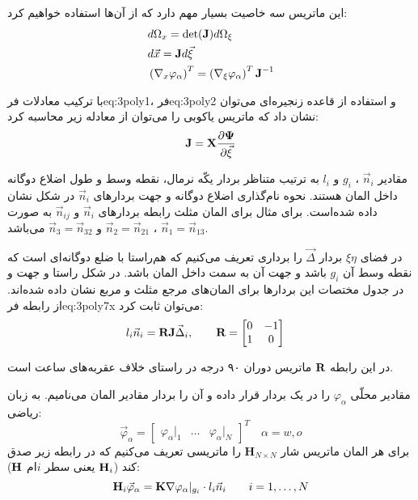 این ماتریس سه خاصیت بسیار مهم دارد که از آن‌ها استفاده خواهیم کرد:
\begin{align}
\label{eq:3poly7}
&d\Omega_x = \text{det}(\textbf J) d\Omega_\xi \\
\label{eq:3poly7x}
&d\vec x = \textbf J d\vec \xi \\
\label{eq:3poly7xx}
&\left( \nabla_x \varphi_\alpha \right)^T = \left(\nabla_\xi \varphi_\alpha\right)^T \textbf J ^ {-1}
\end{align}

با ترکیب معادلات ‌فر{eq:3poly1}، ‌فر{eq:3poly2} و استفاده از قاعده زنجیره‌ای می‌توان نشان داد که ماتریس یاکوبی را می‌توان از معادله زیر محاسبه کرد:
\begin{equation}
\label{eq:3poly8}
\textbf J =  \textbf X \frac{\partial \mathbf \Psi}{\partial \vec \xi} 
\end{equation}

مقادیر 
$\vec n_i$ ، $g_i$ و $l_i$
به ترتیب متناظر بردار یکّه نرمال، نقطه وسط و طول اضلاع دوگانه داخل المان هستند. نحوه نام‌گذاری اضلاع دوگانه و جهت بردار‌های $\vec n_i$ در شکل  نشان داده شده‌است. برای مثال برای المان مثلث رابطه بردارهای $\vec n_i$ و $\vec n_{ij}$ به صورت 
$\vec n_1 = \vec n_{13}$ ، $\vec n_2 = \vec n_{21}$ و $\vec n_3 = \vec n_{32}$
می‌باشد.

در فضای $\xi \eta$ بردار‌ $\vec \Delta$ را برداری تعریف می‌کنیم که هم‌راستا با ضلع دوگانه‌ای است که نقطه وسط آن $g_i$ باشد و جهت آن به سمت داخل المان باشد. در شکل  راستا و جهت و در جدول  مختصات این بردار‌ها برای المان‌های مرجع مثلث و مربع نشان داده‌ شده‌اند. از رابطه ‌فر{eq:3poly7x} می‌توان ثابت کرد:
\begin{equation}
\label{eq:3poly9}
l_i\vec n_i = \textbf R \textbf J \vec \Delta_i, 
\qquad \textbf{R} = 
	\begin{bmatrix}
	0 &-1 \\ 1 &0 
	\end{bmatrix} \quad
\end{equation}

در این رابطه $\textbf R$ ماتریس دوران ۹۰ درجه در راستای خلاف عقربه‌های ساعت است.

مقادیر محلّی $\varphi_\alpha$ را در یک بردار قرار داده و آن را بردار مقادیر المان می‌نامیم. به زبان ریاضی:
\begin{equation}
\label{eq:3poly10}
\vec \varphi_\alpha = 
	\begin{bmatrix}
	\varphi_\alpha|_1 &\ldots &\varphi_\alpha|_N 
	\end{bmatrix}^T \quad
\alpha = w,o
\end{equation}
برای هر المان  ماتریس شار  $\textbf {H}_{N\times N}$  را ماتریسی تعریف می‌کنیم که در رابطه زیر صدق کند ($\textbf H_i$ یعنی سطر $i$ام $\textbf H$):
\begin{equation}
\label{eq:3poly11}
\textbf H_i \vec \varphi_\alpha = \textbf K \nabla \varphi_\alpha|_{g_i} \cdot l_i\vec n_i
\qquad i = 1,\ldots,N
\end{equation}

